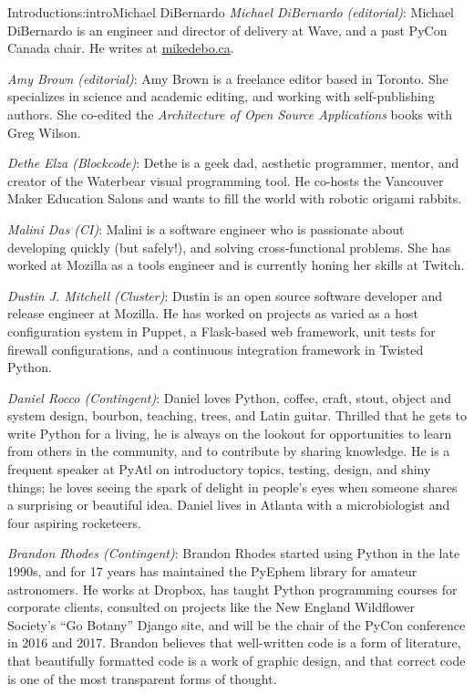 \begin{aosachapter}{Introduction}{s:intro}{Michael DiBernardo}
\hspace{\parindent} \emph{Michael DiBernardo (editorial)}: Michael DiBernardo is an engineer and director of delivery at Wave, and a past PyCon Canada chair. He writes at \url{mikedebo.ca}.

\emph{Amy Brown (editorial)}: Amy Brown is a freelance editor based in Toronto. She specializes in science and academic editing, and working with self-publishing authors. She co-edited the \emph{Architecture of Open Source Applications} books with Greg Wilson. 

\emph{Dethe Elza (Blockcode)}: Dethe is a geek dad, aesthetic programmer, mentor, and creator of the Waterbear visual programming tool. He co-hosts the Vancouver Maker Education Salons and wants to fill the world with robotic origami rabbits. 

\emph{Malini Das (CI)}: Malini is a software engineer who is passionate about developing quickly (but safely!), and solving cross-functional problems. She has worked at Mozilla as a tools engineer and is currently honing her skills at Twitch. 

\emph{Dustin J. Mitchell (Cluster)}: Dustin is an open source software developer and release engineer at Mozilla. He has worked on projects as varied as a host configuration system in Puppet, a Flask-based web framework, unit tests for firewall configurations, and a continuous integration framework in Twisted Python. 

\emph{Daniel Rocco (Contingent)}: Daniel loves Python, coffee, craft, stout, object and system design, bourbon, teaching, trees, and Latin guitar. Thrilled that he gets to write Python for a living, he is always on the lookout for opportunities to learn from others in the community, and to contribute by sharing knowledge. He is a frequent speaker at PyAtl on introductory topics, testing, design, and shiny things; he loves seeing the spark of delight in people's eyes when someone shares a surprising or beautiful idea. Daniel lives in Atlanta with a microbiologist and four aspiring rocketeers.

\emph{Brandon Rhodes (Contingent)}: Brandon Rhodes started using Python in the late 1990s, and for 17 years has maintained the PyEphem library for amateur astronomers. He works at Dropbox, has taught Python programming courses for corporate clients, consulted on projects like the New England Wildflower Society's ``Go Botany'' Django site, and will be the chair of the PyCon conference in 2016 and 2017. Brandon believes that well-written code is a form of literature, that beautifully formatted code is a work of graphic design, and that correct code is one of the most transparent forms of thought.


\end{aosachapter}
